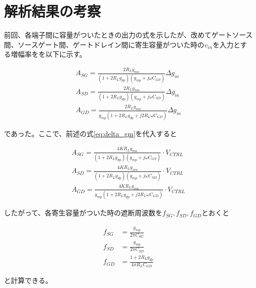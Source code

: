 \documentclass[twocolumn]{jsarticle}
\begin{document}
\section{解析結果の考察}
前回、各端子間に容量がついたときの出力の式を示したが、改めてゲートソース間、ソースゲート間、ゲートドレイン間に寄生容量がついた時の$v_{in}$を入力とする増幅率をを以下に示す。

\begin{align*}
    A_{SG}=\frac{2R_{L}g_{mn}}{ (1+2R_{L}g_{dp})(g_{mp}+j\omega C_{GS}) }\Delta g_{m}  \\
    A_{SD}=\frac{2R_{L}g_{mn}}{ (1+2R_{L}g_{dp})(g_{mp}+j\omega C_{SD}) }\Delta g_{m}  \\
    A_{GD}=\frac{2R_{L}g_{mn} }{ g_{mp}(1+2R_{L}g_{dp} + j2R_{L}\omega C_{GD}) }\Delta g_{m}  
\end{align*}

であった。ここで、前述の式\eqref{eq:delta_gm}を代入すると

\begin{align}
    A_{SG}=\frac{4KR_{L}g_{mn} }{ (1+2R_{L}g_{dp})(g_{mp}+j\omega C_{GS}) }\cdot V_{CTRL}  \label{eq:a_sg}\\
    A_{SD}=\frac{4KR_{L}g_{mn} }{ (1+2R_{L}g_{dp})(g_{mp}+j\omega C_{SD}) }\cdot V_{CTRL}  \label{eq:a_sd}\\
    A_{GD}=\frac{4KR_{L}g_{mn} }{ g_{mp}(1+2R_{L}g_{dp} + j2R_{L}\omega C_{GD}) }\cdot V_{CTRL}    \label{eq:a_gd}
\end{align}

したがって、各寄生容量がついた時の遮断周波数を$f_{SG},f_{SD},f_{GD}$とおくと

\begin{align}
    f_{SG} &= \frac{g_{mp}}{2\pi C_{SG}}    \label{eq:cutoff_sg}\\
    f_{SD} &= \frac{g_{mp}}{2\pi C_{SD}}    \label{eq:cutoff_sd}\\
    f_{GD} &= \frac{1+2R_{L}g_{dp}}{4\pi R_{L}C_{GD}}      \label{eq:cutoff_gd}
\end{align}

と計算できる。
    
\end{document}
